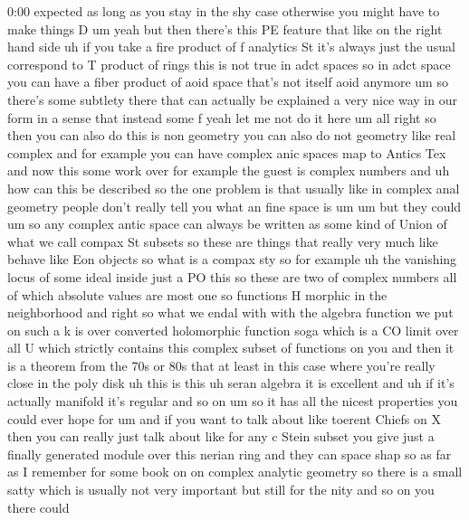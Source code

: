 \begin{unfinished}{0:00}
expected  as  long  as  you  stay  in  the  shy
case  otherwise  you  might  have  to  make
things  D
um
yeah  but  then  there's  this  PE  feature
that  like  on  the  right  hand  side  uh  if
you  take  a  fire  product  of  f  analytics
St  it's  always  just  the  usual  correspond
to  T  product  of  rings  this  is  not  true
in  adct  spaces  so  in  adct  space  you  can
have  a  fiber  product  of  aoid  space
that's  not  itself  aoid  anymore  um  so
there's  some  subtlety  there  that  can
actually  be  explained  a  very  nice  way  in
our  form  in  a  sense  that  instead  some  f
yeah  let  me  not  do  it
here
um  all  right  so  then  you  can  also  do
this  is  non  geometry  you  can  also  do  not
geometry  like  real  complex  and  for
example  you  can  have  complex  anic  spaces
map  to  Antics
Tex  and  now  this  some  work  over  for
example  the  guest  is  complex
numbers  and
uh  how  can  this  be  described  so  the  one
problem  is  that  usually  like  in  complex
anal  geometry  people  don't  really  tell
you  what  an  fine  space  is  um
um  but  they  could  um
so  any  complex  antic  space  can  always  be
written  as  some  kind  of  Union  of  what  we
call  compax  St
subsets  so  these  are  things  that  really
very  much  like  behave  like  Eon  objects
so  what  is  a  compax
sty  so  for
example  uh  the  vanishing  locus  of  some
ideal
inside  just  a  PO
this  so  these  are  two  of  complex
numbers  all  of  which  absolute  values  are
most
one  so  functions  H  morphic  in  the
neighborhood  and  right  so  what  we  endal
with  with  the  algebra  function  we  put  on
such  a  k  is  over  converted  holomorphic
function
soga  which  is  a  CO  limit  over  all  U
which  strictly  contains  this  complex
subset  of  functions  on
you  and  then  it  is  a  theorem  from  the
70s  or  80s  that  at  least  in  this  case
where  you're  really  close  in  the  poly
disk  uh  this  is  this  uh  seran
algebra  it  is  excellent  and  uh  if  it's
actually  manifold  it's  regular  and  so  on
um  so  it  has  all  the  nicest  properties
you  could  ever  hope  for
um  and  if  you  want  to  talk  about  like
toerent  Chiefs  on  X  then  you  can  really
just  talk  about  like  for  any  c  Stein
subset  you  give  just  a  finally  generated
module  over  this  nerian  ring  and  they
can  space  shap  so  as  far  as  I  remember
for  some  book  on  on  complex  analytic
geometry  so  there  is  a  small  satty  which
is  usually  not  very  important  but  still
for  the  nity  and  so  on  you  there  could

\end{unfinished}
